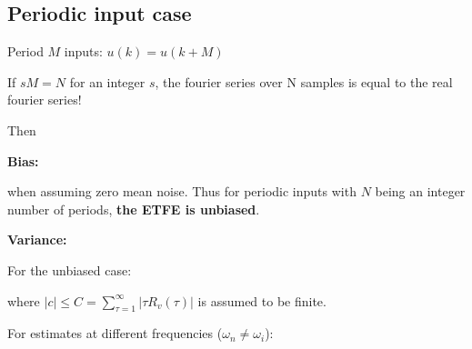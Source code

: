 \documentclass[10pt,a4paper]{scrartcl}
\begin{document}
\begin{multicols*}{2}


\subsection{Periodic input case}

Period $M$ inputs: $u(k)=u(k+M)$

If $sM = N$ for an integer $s$, the fourier series over N samples is equal to the real fourier series!


Then




\textbf{Bias:}


when assuming zero mean noise. Thus for periodic inputs with $N$ being an integer number of periods, \textbf{the ETFE is unbiased}.

\textbf{Variance:}

For the unbiased case:

\renewcommand{\expe}[1]{\text{E}\left\{#1\right\}}


where $|c|\leq C=\sum\limits_{\tau =1}^\infty |\tau R_v(\tau)|$ is assumed to be finite.

For estimates at different frequencies ($\omega_n\neq\omega_i$):



\end{multicols*}
\end{document}
